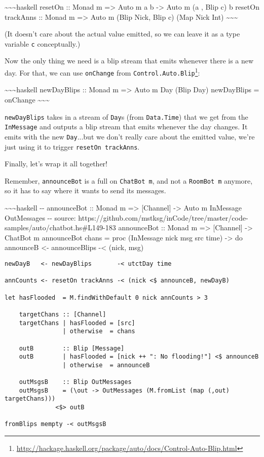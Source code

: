 \documentclass[]{article}
\renewcommand{\href}[2]{#2\footnote{\url{#1}}}
\begin{document}
\textasciitilde{}\textasciitilde{}\textasciitilde{}haskell resetOn :: Monad m
=\textgreater{} Auto m a b -\textgreater{} Auto m (a , Blip c) b resetOn
trackAnns :: Monad m =\textgreater{} Auto m (Blip Nick, Blip c) (Map Nick Int)
\textasciitilde{}\textasciitilde{}\textasciitilde{}

(It doesn't care about the actual value emitted, so we can leave it as a type
variable \texttt{c} conceptually.)

Now the only thing we need is a blip stream that emits whenever there is a new
day. For that, we can use \texttt{onChange} from
\href{http://hackage.haskell.org/package/auto/docs/Control-Auto-Blip.html}{\texttt{Control.Auto.Blip}}:

\textasciitilde{}\textasciitilde{}\textasciitilde{}haskell newDayBlips :: Monad
m =\textgreater{} Auto m Day (Blip Day) newDayBlips = onChange
\textasciitilde{}\textasciitilde{}\textasciitilde{}

\texttt{newDayBlips} takes in a stream of \texttt{Day}s (from
\texttt{Data.Time}) that we get from the \texttt{InMessage} and outputs a blip
stream that emits whenever the day changes. It emits with the new
\texttt{Day}...but we don't really care about the emitted value, we're just
using it to trigger \texttt{resetOn\ trackAnns}.

Finally, let's wrap it all together!

Remember, \texttt{announceBot} is a full on \texttt{ChatBot\ m}, and not a
\texttt{RoomBot\ m} anymore, so it has to say where it wants to send its
messages.

\textasciitilde{}\textasciitilde{}\textasciitilde{}haskell -\/- announceBot ::
Monad m =\textgreater{} {[}Channel{]} -\textgreater{} Auto m InMessage
OutMessages -\/- source:
https://github.com/mstksg/inCode/tree/master/code-samples/auto/chatbot.hs\#L149-183
announceBot :: Monad m =\textgreater{} {[}Channel{]} -\textgreater{} ChatBot m
announceBot chans = proc (InMessage nick msg src time) -\textgreater{} do
announceB \textless{}- announceBlips -\textless{} (nick, msg)

\begin{verbatim}
newDayB   <- newDayBlips       -< utctDay time

annCounts <- resetOn trackAnns -< (nick <$ announceB, newDayB)

let hasFlooded  = M.findWithDefault 0 nick annCounts > 3

    targetChans :: [Channel]
    targetChans | hasFlooded = [src]
                | otherwise  = chans

    outB        :: Blip [Message]
    outB        | hasFlooded = [nick ++ ": No flooding!"] <$ announceB
                | otherwise  = announceB

    outMsgsB    :: Blip OutMessages
    outMsgsB    = (\out -> OutMessages (M.fromList (map (,out) targetChans)))
              <$> outB

fromBlips mempty -< outMsgsB
\end{verbatim}
\end{document}
